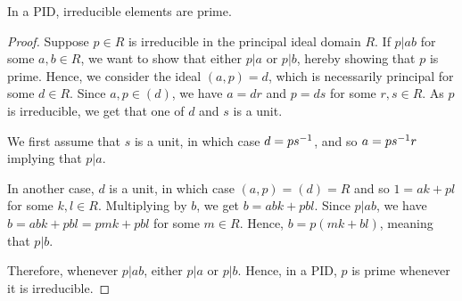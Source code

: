 \documentclass[12pt]{article}
\begin{document}
\begin{lemma}
    In a PID, irreducible elements are prime.
\end{lemma}
\begin{proof}
    \parskip =0pt
    Suppose $p\in R$ is irreducible in the principal ideal domain $R$. If $p|ab$ for some $a,b\in R$, we want to show that either $p|a$ or $p|b$, hereby showing that $p$ is prime. Hence, we consider the ideal $(a,p)=d$, which is necessarily principal for some $d\in R$. Since $a,p\in (d)$, we have $a=dr$ and $p=ds$ for some $r,s\in R$. As $p$ is irreducible, we get that one of $d$ and $s$ is a unit. 
    
    We first assume that $s$ is a unit, in which case $d=ps^{-1}$, and so $a=ps^{-1}r$ implying that $p|a$. 
    
    In another case, $d$ is a unit, in which case $(a,p)=(d)=R$ and so $1=ak+pl$ for some $k,l\in R$. Multiplying by $b$, we get $b=abk+pbl$. Since $p|ab$, we have $b=abk+pbl=pmk+pbl$ for some $m\in R$. Hence, $b=p(mk+bl)$, meaning that $p|b$.

    Therefore, whenever $p|ab$, either $p|a$ or $p|b$. Hence, in a PID, $p$ is prime whenever it is irreducible.
\end{proof}
\end{document}
